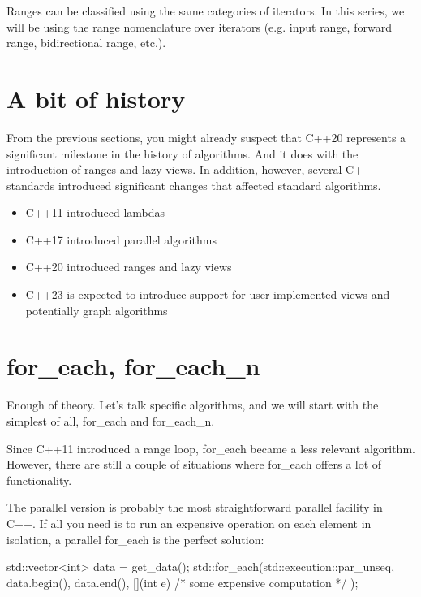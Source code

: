 Ranges can be classified using the same categories of iterators. In this series, we will be using the range nomenclature over iterators (e.g. input range, forward range, bidirectional range, etc.).

\section{A bit of history}

From the previous sections, you might already suspect that C++20 represents a significant milestone in the history of algorithms. And it does with the introduction of ranges and lazy views. In addition, however, several C++ standards introduced significant changes that affected standard algorithms.

\begin{itemize}
    \item C++11 introduced lambdas
    \item C++17 introduced parallel algorithms
    \item C++20 introduced ranges and lazy views
    \item C++23 is expected to introduce support for user implemented views and potentially graph algorithms
\end{itemize}

\section{for\_each, for\_each\_n}

Enough of theory. Let’s talk specific algorithms, and we will start with the simplest of all, for\_each and for\_each\_n.


Since C++11 introduced a range loop, for\_each became a less relevant algorithm. However, there are still a couple of situations where for\_each offers a lot of functionality.

The parallel version is probably the most straightforward parallel facility in C++. If all you need is to run an expensive operation on each element in isolation, a parallel for\_each is the perfect solution:

\begin{box-note}
\begin{cppcode}
std::vector<int> data = get_data();
std::for_each(std::execution::par_unseq, 
    data.begin(), data.end(),
    [](int e) { /* some expensive computation */ });
\end{cppcode}
\end{box-note}

